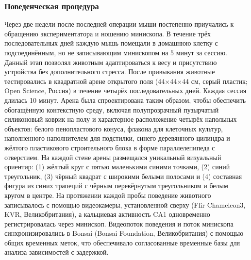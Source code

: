 \subsubsection{Поведенческая процедура}
\label{sec:behavioral_procedure}
Через две недели после последней операции мыши постепенно приучались к обращению экспериментатора и ношению минископа. В течение трёх последовательных дней каждую мышь помещали в домашнюю клетку с подсоединённым, но не записывающим минископом на 5 минут за сессию. Данный этап позволял животным адаптироваться к весу и присутствию устройства без дополнительного стресса. После привыкания животные тестировались в квадратной арене открытого поля (44$\times$44$\times$44 см, серый пластик; Open Science, Россия) в течение четырёх последовательных дней. Каждая сессия длилась 10 минут. Арена была спроектирована таким образом, чтобы обеспечить обогащённую контекстную среду, включая полупрозрачный пузырчатый силиконовый коврик на полу и характерное расположение четырёх напольных объектов: белого пенопластового конуса, флакона для клеточных культур, наполненного наполнителем для подстилки, синего деревянного цилиндра и жёлтого пластикового строительного блока в форме параллелепипеда с отверстием. На каждой стене арены размещался уникальный визуальный ориентир: (1) жёлтый круг с пятью маленькими синими точками, (2) синий треугольник, (3) чёрный квадрат с широкими белыми полосами и (4) составная фигура из синих трапеций с чёрным перевёрнутым треугольником и белым кругом в центре. На протяжении каждой пробы поведение животного записывалось с помощью видеокамеры, установленной сверху (Flir Chameleon3, KVR, Великобритания), а кальциевая активность CA1 одновременно регистрировалась через минископ. Видеопоток поведения и поток минископа синхронизировались в Bonsai (Bonsai Foundation, Великобритания) с помощью общих временных меток, что обеспечивало согласованные временные базы для анализа зависимостей с задержкой.

